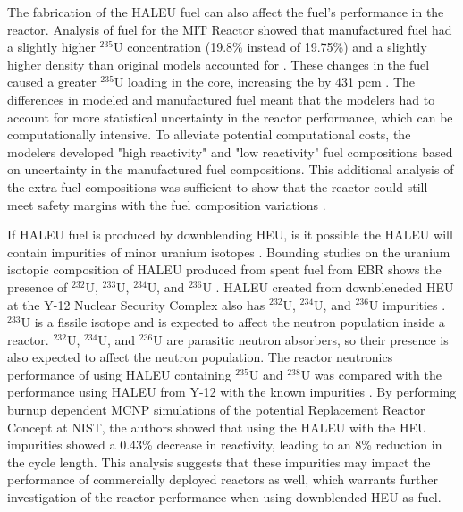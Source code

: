 The fabrication of the \gls{HALEU} fuel can also affect the fuel's 
performance in the reactor. Analysis of fuel for the \gls{MIT} 
Reactor showed that manufactured fuel had a slightly higher $^{235}$U 
concentration (19.8\% instead of 19.75\%) and a slightly higher 
density than original models accounted for \cite{mascolino_impact_2022}. 
These changes in the fuel caused a greater $^{235}$U loading in the core, 
increasing the \keff by 431 pcm \cite{mascolino_impact_2022}. The 
differences in modeled and manufactured fuel meant that the modelers 
had to account for more statistical uncertainty in the reactor performance, 
which can be computationally intensive. To alleviate potential 
computational costs, the modelers developed "high reactivity" and 
"low reactivity" fuel compositions based on uncertainty in the manufactured 
fuel compositions. This additional analysis of the extra fuel compositions 
was sufficient to show that the reactor could still meet safety margins 
with the fuel composition variations \cite{mascolino_impact_2022}.

If \gls{HALEU} fuel is produced by downblending \gls{HEU}, is it possible 
the \gls{HALEU} will contain impurities of minor uranium 
isotopes \cite{nuclear_energy_institute_establishing_2022}. Bounding studies on the 
uranium 
isotopic composition of \gls{HALEU} produced from spent fuel from \gls{EBR} 
shows the presence of $^{232}$U, $^{233}$U, $^{234}$U, and $^{236}$U
\cite{vaden_isotopic_2018}. 
\gls{HALEU} created from downbleneded \gls{HEU} at the Y-12 Nuclear Security 
Complex also has $^{232}$U, $^{234}$U, and $^{236}$U impurities
\cite{nelson_foreign_2010}. $^{233}$U is a fissile 
isotope and is expected to affect the neutron population inside a reactor.
$^{232}$U, $^{234}$U, and $^{236}$U are parasitic neutron absorbers, so 
their presence is also expected to affect the neutron population. The 
reactor neutronics performance of using \gls{HALEU} containing $^{235}$U 
and $^{238}$U was compared 
with the performance using \gls{HALEU} from Y-12 with the known impurities 
\cite{celikten_effects_2021}. By performing burnup dependent \gls{MCNP} 
simulations of the potential Replacement Reactor Concept at \gls{NIST}, 
the authors showed that using the \gls{HALEU} with the \gls{HEU} 
impurities showed a 0.43\% decrease in reactivity, leading to an 8\% reduction 
in the cycle length. This analysis suggests that these impurities may 
impact the performance of commercially deployed reactors as well, which 
warrants further investigation of the reactor performance when using 
downblended \gls{HEU} as fuel. 